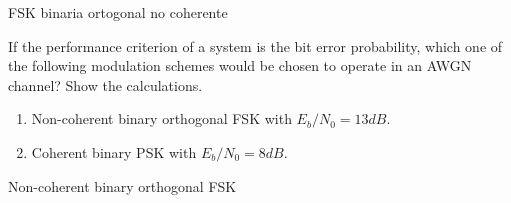 \documentclass[es,boletin]{uah}
\begin{document}
{

FSK binaria ortogonal no coherente
}
{

	\cite{Sklar} If the performance criterion of a system is the bit error probability, which one of the following modulation schemes would be chosen to operate in an AWGN channel? Show the calculations.

\begin{enumerate}
	\item Non-coherent binary orthogonal FSK with $E_b/N_0 = 13 dB$.
	\item Coherent binary PSK with $E_b/N_0 = 8 dB$.
\end{enumerate}

}
{

Non-coherent binary orthogonal FSK
}
\end{document}
